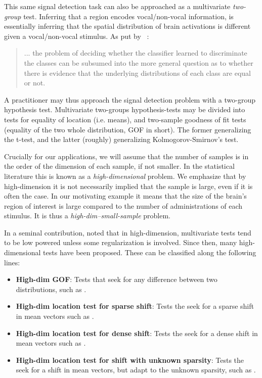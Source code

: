 \documentclass[]{bio}
\begin{document}
This same signal detection task can also be approached as a multivariate \emph{two-group} test.
Inferring that a region encodes vocal/non-vocal information, is essentially inferring that the spatial distribution of brain activations is different given a vocal/non-vocal stimulus. 
As put by ~\cite{pereira_machine_2009}: 
\begin{quote}
	... the problem of deciding whether the classifier learned to discriminate the classes can be subsumed into the more general question as to whether there is evidence that the underlying distributions of each class are equal or not.
\end{quote}
A practitioner may thus approach the signal detection problem with a two-group hypothesis test.
Multivariate two-groups hypothesis-tests may be divided into tests for equality of location (i.e. means), and two-sample goodness of fit tests (equality of the two whole distribution, GOF in short).
The former generalizing the t-test, and the latter (roughly) generalizing Kolmogorov-Smirnov's test.


Crucially for our applications, we will assume that the number of samples is in the order of the dimension of each sample, if not smaller. 
In the statistical literature this is known as a \emph{high-dimensional} problem. 
We emphasize that by high-dimension it is not necessarily implied that the sample is large, even if it is often the case. 
In our motivating example it means that the size of the brain's region of interest is large compared to the number of administrations of each stimulus. 
It is thus a \emph{high-dim--small-sample} problem. 

In a seminal contribution, \citet{bai1996effect} noted that in high-dimension, multivariate tests tend to be low powered unless some regularization is involved. 
Since then, many high-dimensional tests have been proposed. 
These can be classified along the following lines:
\begin{itemize}
	\item \textbf{High-dim GOF}: Tests that seek for any difference between two distributions, such as  \cite{hall2002permutation,szekely_brownian_2009,gretton_kernel_2012-1}.
	
	\item \textbf{High-dim location test for sparse shift}: Tests the seek for a sparse shift in mean vectors such as \cite{tony2014two,chang2014simulation}.
	
	\item \textbf{High-dim location test for dense shift}: Tests the seek for a dense shift in mean vectors such as  \cite{dempster1958high,bai1996effect,schafer_shrinkage_2005,goeman2006testing,srivastava_multivariate_2007,lopes2011more,nishiyama2013testing,thulin2014high,shen2015adaptive,xu2016adaptive,zhang2016high}.
	
	\item \textbf{High-dim location test for shift with unknown sparsity}: Tests the seek for a shift in mean vectors, but adapt to the unknown sparsity, such as \cite{donoho2004higher,zhong2013tests,moscovich2016exact}.
	
\end{itemize}
\end{document}
